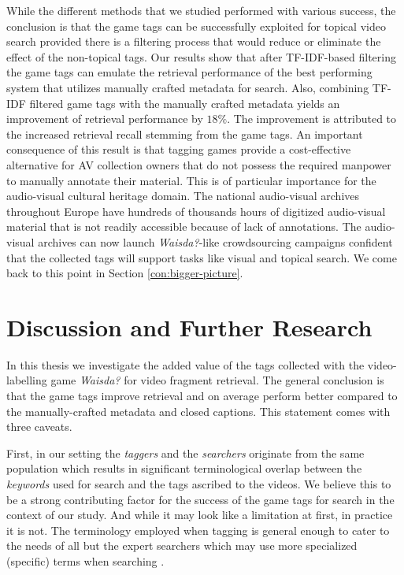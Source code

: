 While the different methods that we studied performed with various success, the conclusion is that the
game tags can be successfully exploited for topical video search provided there is a filtering process that would reduce or eliminate the effect of the non-topical tags. Our results show that after TF-IDF-based filtering the game tags can emulate the retrieval performance of the best performing system that utilizes manually crafted metadata for search. Also, combining TF-IDF filtered game tags with the manually crafted metadata yields an improvement of retrieval performance by $18\%$. The improvement is attributed to the increased retrieval recall stemming from the game tags. An important consequence of this result is that tagging games provide a cost-effective alternative for AV collection owners that do not possess the required manpower to manually annotate their material. This is of particular importance for the audio-visual cultural heritage domain. The national audio-visual archives throughout Europe have hundreds of thousands hours of digitized audio-visual material that is not readily accessible because of lack of annotations. The audio-visual archives can now launch \textit{Waisda?}-like crowdsourcing campaigns confident that the collected tags will support tasks like visual and topical search. We come back to this point in Section \ref{con:bigger-picture}.
 
\section{Discussion and Further Research}
In this thesis we investigate the added value of the tags collected with the video-labelling game \textit{Waisda?} for video fragment retrieval. The general conclusion is that the game tags improve retrieval and on average perform better compared to the manually-crafted metadata and closed captions. This statement comes with three caveats.

First, in our setting the \textit{taggers} and the \textit{searchers} originate from the same population which results in significant terminological overlap between the \textit{keywords} used for search and the tags ascribed to the videos. We believe this to be a strong contributing factor for the success of the game tags for search in the context of our study. And while it may look like a limitation at first, in practice it is not. The terminology employed when tagging is general enough to cater to the needs of all but the expert searchers which may use more specialized (specific) terms when searching \cite{liliana}.

